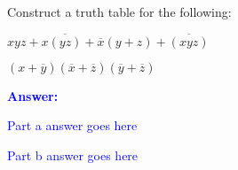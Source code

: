 \item{}
Construct a truth table for the following:
\begin{list}{\textbf{}}{}
    \item $xyz+x\overline{(yz)}+\overline{x}(y+z)+\overline{(xyz)}$
    \item $(x+\overline{y})(\overline{x}+\overline{z})(\overline{y}+\overline{z})$
\end{list}
\vskip12pt
\ifanswers
\textcolor{blue}{
\textbf{Answer:}\\
\begin{list}{\textbf{}}{}
\item Part a answer goes here
\item Part b answer goes here
\end{list}
}
\newpage
\fi
